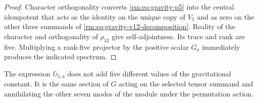 \begin{proof}
Character orthogonality converts \cref{rm:eq:gravity-p5} into the
central idempotent that acts as the identity on the unique copy of
\(V_5\) and as zero on the other three summands of
\cref{rm:eq:gravity-v12-decomposition}. Reality of the character and
orthogonality of \(\rho_{12}\) give self-adjointness. Its trace and rank
are five. Multiplying a rank-five projector by the positive scalar
\(G_a\) immediately produces the indicated spectrum.
\end{proof}

The expression \(\mathbb G_{5,a}\) does not add five different values of
the gravitational constant. It is the same section of \(G\) acting on
the selected tensor summand and annihilating the other seven modes of the
module under the permutation action.
